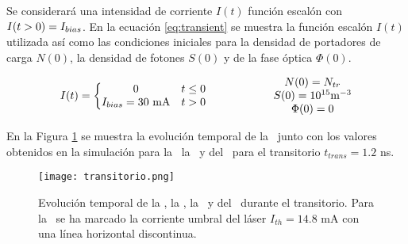	Se considerará una intensidad de corriente $I(t)$ función escalón con $I(t>0) = I_{bias}$. En la ecuación \ref{eq:transient} se muestra la función escalón $I(t)$ utilizada así como las condiciones iniciales para la densidad de portadores de carga $N(0)$, la densidad de fotones $S(0)$ y de la fase óptica $\Phi(0)$.

		\begin{equation}
			\begin{matrix}
					I(t) = \left\{\begin{matrix}
									0 & t \leq 0\\ 
									I_{bias} = 30 \textrm{ mA} & t > 0
							\end{matrix}\right.
					& & & & & & 
					\begin{matrix}
						N(0) = N_{tr} \\ S(0) = 10^{15} \textrm{m}^{-3}\\ \Phi(0) = 0
					\end{matrix}
				\end{matrix}
			\label{eq:transient}
		\end{equation}

	En la Figura \ref{Img:transitorio} se muestra la evolución temporal de la \I\ junto con los valores obtenidos en la simulación para la \n\, la \s\ y del \chirp\ para el transitorio $t_{trans} = 1.2$ ns.

		\begin{figure}[H]
			\centering
			\texttt{[image: transitorio.png]}
			\caption{\label{Img:transitorio}Evolución temporal de la \I, la \s, la \n\ y del \chirp\ durante el transitorio. Para la \I\ se ha marcado la corriente umbral del láser $I_{th} = 14.8$ mA con una línea horizontal discontinua.}	
		\end{figure}
		
